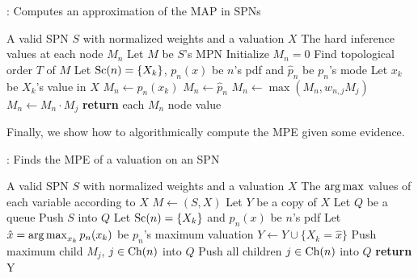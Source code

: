 \begin{algorithm}[H]
  \caption{: Computes an approximation of the MAP in SPNs}
  \begin{algorithmic}[1]
    \Require A valid SPN $S$ with normalized weights and a valuation $X$
    \Ensure The hard inference values at each node $M_n$
    \State Let $M$ be $S$'s MPN
    \State Initialize $M_n=0$
    \State Find topological order $T$ of $M$
        \State Let $\operatorname*{\text{Sc}}(n)=\{X_k\}$, $p_n(x)$ be $n$'s pdf and $\hat{p}_n$ be $p_n$'s mode
          \State Let $x_k$ be $X_k$'s value in $X$
          \State $M_n\gets p_n(x_k)$
        \Else%
          \State $M_n\gets\hat{p}_n$
        \EndIf%
          \State $M_n\gets\max(M_n, w_{n,j}M_j)$
        \EndFor%
      \Else%
          \State $M_n\gets M_n\cdot M_j$
        \EndFor%
      \EndIf
    \EndFor%
    \State \textbf{return} each $M_n$ node value
  \end{algorithmic}
\end{algorithm}

Finally, we show how to algorithmically compute the MPE given some evidence.

\begin{algorithm}[H]
  \caption{: Finds the MPE of a valuation on an SPN}
  \begin{algorithmic}[1]
    \Require A valid SPN $S$ with normalized weights and a valuation $X$
    \Ensure The $\operatorname*{arg\,max}$ values of each variable according to $X$
    \State $M\gets$$(S, X)$
    \State Let $Y$ be a copy of $X$
    \State Let $Q$ be a queue
    \State Push $S$ into $Q$
        \State Let $\operatorname*{\text{Sc}}(n)=\{X_k\}$ and $p_n(x)$ be $n$'s pdf
        \State Let $\hat{x}=\operatorname*{arg\,max}_{x_k} p_n(x_k)$ be $p_n$'s maximum valuation
          \State $Y\gets Y\cup\{X_k=\hat{x}\}$
        \EndIf%
        \State Push maximum child $M_j$, $j\in\operatorname*{\text{Ch}}(n)$ into $Q$
      \Else%
        \State Push all children $j\in\operatorname*{\text{Ch}}(n)$ into $Q$
      \EndIf
    \EndFor%
    \State \textbf{return} Y
  \end{algorithmic}
\end{algorithm}
